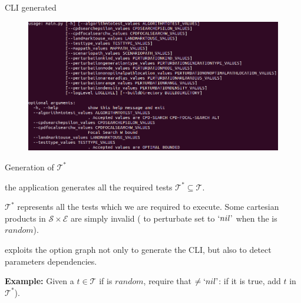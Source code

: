 \begin{frame}{CLI generated}
    \begin{figure}
        \centering
        \includegraphics[width=1.0\textwidth]{src/images/help.png}
    \end{figure}
\end{frame}

\begin{frame}{Generation of $\mathcal{T}^{*}$}
    \begin{block}{\hphantom{}}
        the application generates all the required tests $\mathcal{T}^{*} \subseteq \mathcal{T}$.
    \end{block}

    $\mathcal{T}^{*}$ represents all the tests which we are required to execute. Some cartesian products in $\mathcal{S} \times \mathcal{E}$ are simply invalid (\eg{}  to perturbate set to $\squote{nil}$ when the  is $random$).

     exploits the option graph not only to generate the CLI, but also to detect parameters dependencies.
    
    \textbf{Example:} Given a $t \in \mathcal{T}$ if  is $random$, require that $\not = \squote{nil}$: if it is true, add $t$ in $\mathcal{T}^{*}$).
\end{frame}

